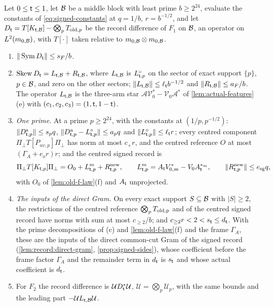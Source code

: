 \begin{proposition}
\label{prop:signed-bounds}
Let $0\le\mathsf t\le1$, let $\mathcal B$ be a middle block with least prime $b\ge2^{24}$,
evaluate the constants of \eqref{eq:signed-constants} at $q=1/b$, $r=b^{-1/2}$,
and let $D_\mathsf t=T[K_{\mathsf t,\mathcal B}]-\bigotimes_pT_{{\rm old},p}$ be the record
difference of $F_1$ on $\mathcal B$, an operator on $L^2(m_{0,\mathcal B})$, with $T[\cdot]$
taken relative to $m_{0,\mathcal B}\otimes m_{0,\mathcal B}$.
\begin{enumerate}[label=(\alph*)]
\item $\|\operatorname{Sym}D_\mathsf t\|\le s_F/b$.
\item $\operatorname{Skew}D_\mathsf t=L_{\mathsf t,\mathcal B}+R_{\mathsf t,\mathcal B}$, where $L_{\mathsf t,\mathcal B}$ is
 $L^\circ_{\mathsf t,p}$ on the sector of exact support $\{p\}$, $p\in\mathcal B$, and zero on
 the other sectors; $\|L_{\mathsf t,\mathcal B}\|\le\ell_\mathsf t b^{-1/2}$ and
 $\|R_{\mathsf t,\mathcal B}\|\le a_F/b$. The operator $L_{\mathsf t,\mathcal B}$ is the three-arm star
 $\mathcal A\mathcal V_0^*-\mathcal V_0\mathcal A^*$ of \cref{lem:actual-features}(e)
 with $(c_1,c_2,c_3)=(1,\mathsf t,1-\mathsf t)$.
\item \emph{One prime.} At a prime $p\ge2^{24}$, with the constants at
 $(1/p,p^{-1/2})$: $\|D^{\rm s}_{\mathsf t,p}\|\le s_pq$,
 $\|D^{\rm a}_{\mathsf t,p}-L^\circ_{\mathsf t,p}\|\le a_pq$ and $\|L^\circ_{\mathsf t,p}\|\le\ell_\mathsf t r$;
 every centred component $\Pi_\perp T[P_{uv,p}]\Pi_\perp$ has norm at most $c_+r$, and
 the centred reference $O$ at most $(\Gamma_A+e_or)r$; and the centred signed
 record is
 \[
  \Pi_\perp T[K_{\mathsf t,p}]\Pi_\perp=O_0+L^m_{\mathsf t,p}+R^{\rm new}_{\mathsf t,p},\qquad
  L^m_{\mathsf t,p}=A_\mathsf t V^*_{0,m}-V_0A_\mathsf t^{*_m},\qquad
  \|R^{\rm new}_{\mathsf t,p}\|\le e_{\rm sg}q,
 \]
 with $O_0$ of \cref{lem:old-f-law}(f) and $A_\mathsf t$ unprojected.
\item \emph{The inputs of the direct Gram.} On every exact support $S\subseteq\mathcal B$
 with $|S|\ge2$, the restrictions of the centred reference
 $\bigotimes_pT_{\rm old,p}$ and of the centred signed record have norms with sum at
 most $c_{\ge2}/b$; and $c_{\ge2}r<2<s_\mathsf t\le d_\mathsf t$. With the prime
 decompositions of (c) and \cref{lem:old-f-law}(f) and the frame $\Gamma_A$, these
 are the inputs of the direct common-cut Gram of the signed record
 (\cref{lem:record:direct-gram}, \cref{prop:signed-sides}), whose coefficient before the frame factor $\Gamma_A$ and the
 remainder term in $d_\mathsf t$ is $s_\mathsf t$ and whose actual coefficient is $d_\mathsf t$.
\item For $F_2$ the record difference is $\mathcal UD_\mathsf t^*\mathcal U$,
 $\mathcal U=\bigotimes_p\mathcal U_p$, with the same bounds and the leading part
 $-\mathcal UL_{\mathsf t,\mathcal B}\mathcal U$.
\end{enumerate}
\end{proposition}

